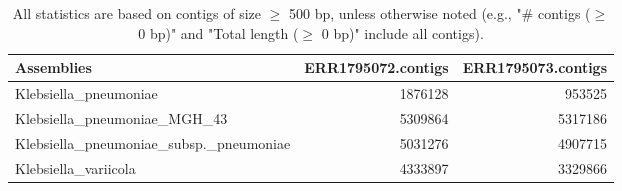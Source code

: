 \documentclass[12pt,a4paper]{article}
\begin{document}
\begin{table}[ht]
\begin{center}
\caption{All statistics are based on contigs of size $\geq$ 500 bp, unless otherwise noted (e.g., "\# contigs ($\geq$ 0 bp)" and "Total length ($\geq$ 0 bp)" include all contigs).}
\begin{tabular}{|l*{2}{|r}|}
\hline
Assemblies & ERR1795072.contigs & ERR1795073.contigs \\ \hline
Klebsiella\_pneumoniae & 1876128 & 953525 \\ \hline
Klebsiella\_pneumoniae\_MGH\_43 & 5309864 & 5317186 \\ \hline
Klebsiella\_pneumoniae\_subsp.\_pneumoniae & 5031276 & 4907715 \\ \hline
Klebsiella\_variicola & 4333897 & 3329866 \\ \hline
\end{tabular}
\end{center}
\end{table}
\end{document}
